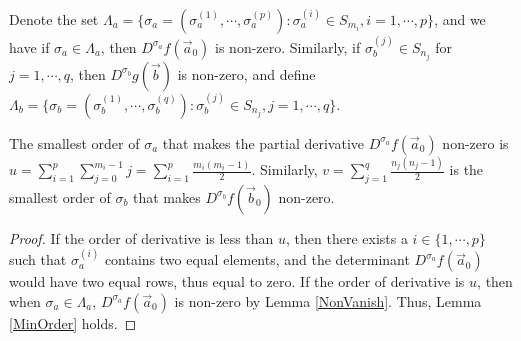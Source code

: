 \begin{remark}{\label{DefLambda}}
Denote the set $\Lambda_{a}=\{\sigma_{a}=(\sigma_{a}^{(1)},\cdots,\sigma_{a}^{(p)}):\sigma_{a}^{(i)}\in S_{m_{i}}, i=1,\cdots,p\}$, and we have if $\sigma_{a}\in \Lambda_{a}$, then $D^{\sigma_{a}}f(\vec{a}_{0})$ is non-zero. Similarly, if $\sigma^{(j)}_{b}\in S_{n_j}$ for $j=1,\cdots,q$, then $D^{\sigma_{b}}g(\vec{b})$ is non-zero, and define $\Lambda_{b}=\{\sigma_{b}=(\sigma_{b}^{(1)},\cdots,\sigma_{b}^{(q)}):\sigma_{b}^{(j)}\in S_{n_{j}}, j=1,\cdots,q\}$.
\end{remark}

\begin{lemma}{\label{MinOrder}}
The smallest order of $\sigma_{a}$ that makes the partial derivative $D^{\sigma_{a}}f(\vec{a}_{0})$ non-zero is $u=\sum_{i=1}^{p}\sum_{j=0}^{m_{i}-1}j=\sum_{i=1}^{p}\frac{m_{i}(m_{i}-1)}{2}$. Similarly, $v=\sum_{j=1}^{q}\frac{n_{j}(n_{j}-1)}{2}$ is the smallest order of $\sigma_{b}$ that makes $D^{\sigma_{b}}f(\vec{b}_{0})$ non-zero.
\end{lemma}
\begin{proof}
	If the order of derivative is less than $u$, then there exists a $i\in\{1,\cdots,p\}$ such that $\sigma_{a}^{(i)}$ contains two equal elements, and the determinant $D^{\sigma_{a}}f(\vec{a}_{0})$ would have two equal rows, thus equal to zero. If the order of derivative is $u$, then when $\sigma_{a}\in\Lambda_{a}$, $D^{\sigma_{a}}f(\vec{a}_{0})$ is non-zero by Lemma \ref{NonVanish}. Thus, Lemma \ref{MinOrder} holds.
\end{proof}

